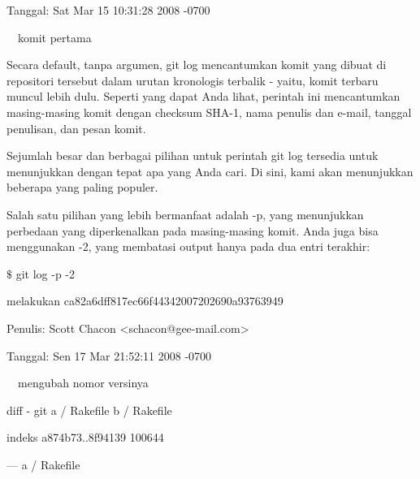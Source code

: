 \noindent 
 \hspace*{0.5in} Tanggal: Sat Mar 15 10:31:28 2008 -0700 \par
\vspace{12pt}
\noindent 
 $  $ $  $ $  $ $  $komit pertama \par
\noindent 
Secara default, tanpa argumen, git log mencantumkan komit yang dibuat di repositori tersebut dalam urutan kronologis terbalik - yaitu, komit terbaru muncul lebih dulu. Seperti yang dapat Anda lihat, perintah ini mencantumkan masing-masing komit dengan checksum SHA-1, nama penulis dan e-mail, tanggal penulisan, dan pesan komit. \par
\noindent 
Sejumlah besar dan berbagai pilihan untuk perintah git log tersedia untuk menunjukkan dengan tepat apa yang Anda cari. Di sini, kami akan menunjukkan beberapa yang paling populer. \par
\vspace{12pt}
\noindent 
Salah satu pilihan yang lebih bermanfaat adalah -p, yang menunjukkan perbedaan yang diperkenalkan pada masing-masing komit. Anda juga bisa menggunakan -2, yang membatasi output hanya pada dua entri terakhir: \par
\vspace{12pt}
\noindent 
 \hspace*{0.5in}  $  \$  $ git log -p -2 \par
\noindent 
 \hspace*{0.5in} melakukan ca82a6dff817ec66f44342007202690a93763949 \par
\noindent 
 \hspace*{0.5in} Penulis: Scott Chacon <schacon@gee-mail.com> \par
\noindent 
 \hspace*{0.5in} Tanggal: Sen 17 Mar 21:52:11 2008 -0700 \par
\vspace{12pt}
\noindent 
 \hspace*{0.5in}  $  $ $  $ $  $ $  $mengubah nomor versinya \par
\vspace{12pt}
\noindent 
 \hspace*{0.5in} diff - git a / Rakefile b / Rakefile \par
\noindent 
 \hspace*{0.5in} indeks a874b73..8f94139 100644 \par
\noindent 
 \hspace*{0.5in} --- a / Rakefile \par
\noindent 
